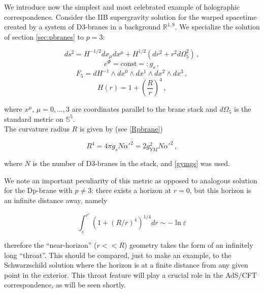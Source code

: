 We introduce now the simplest and most celebrated example of holographic correspondence\cite{Maldacena}. Consider the IIB supergravity solution for the warped spacetime created by a system of D3-branes in a background $\mathbb{R}^{1,9}$. We specialize the solution of section \ref{sec:pbranes} to $p=3$:

\begin{equation}
	ds^2 = H^{-1/2} dx_\mu dx^\mu + H^{1/2} (dr^2 + r^2 d\Omega^2_5)\label{black3metric}\,,
\end{equation}
\begin{equation}
	e^\Phi = \mathrm{const} =: g_s\,,
\end{equation}
\begin{equation}\label{threebraneF5}
	F_5 = dH^{-1} \wedge dx^0 \wedge dx^1 \wedge dx^2 \wedge dx^3\,,
\end{equation}
\begin{equation}
	H(r) = 1 + \left( \frac{R}{r} \right)^4\,,
	\label{}
\end{equation}

where $x^\mu$, $\mu = 0,\ldots,3$ are coordinates parallel to the brane stack and $d\Omega_5$ is the standard metric on $\mathbb{S}^5$.\\

The curvature radius $R$ is given by (see \eqref{Rpbrane})

\begin{equation}
	R^4 = 4\pi g_s N \alpha'^2 = 2 g_{YM}^2 N \alpha'^2\,,
	\label{}
\end{equation}

where $N$ is the number of D3-branes in the stack, and \eqref{gymgs} was used.

We note an important peculiarity of this metric as opposed to analogous solution for the Dp-brane with $p\neq 3$: there exists a horizon at $r=0$, but this horizon is an infinite distance away, namely

\begin{equation}
	\int_\varepsilon^{r'} \left( 1 + \left( R/r \right)^4 \right)^{1/4} dr \sim -\ln\varepsilon
	\label{}
\end{equation}

therefore the ``near-horizon'' ($r<<R$) geometry takes the form of an infinitely long ``throat''. This should be compared, just to make an example, to the Schwarzschild solution where the horizon is at a finite distance from any given point in the exterior. This throat feature will play a crucial role in the AdS/CFT correspondence, as will be seen shortly.

